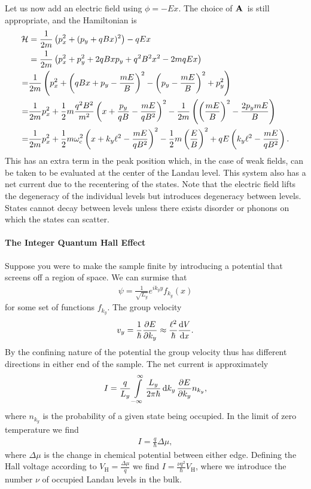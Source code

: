 Let us now add an electric field using $\phi = -Ex$. The choice of $\vb{A}$ is still appropriate, and the Hamiltonian is
\begin{align*}
	\mathcal{H} &= \frac{1}{2m}\left(p_{x}^{2} + (p_{y} + qBx)^{2}\right) - qEx \\
	     &= \frac{1}{2m}\left(p_{x}^{2} + p_{y}^{2} + 2qBxp_{y} + q^{2}B^{2}x^{2} - 2mqEx\right) \\
	     =& \frac{1}{2m}\left(p_{x}^{2} + \left(qBx + p_{y} - \frac{mE}{B}\right)^{2} - \left(p_{y} - \frac{mE}{B}\right)^{2} + p_{y}^{2}\right) \\
	     =& \frac{1}{2m}p_{x}^{2} + \frac{1}{2}m\frac{q^{2}B^{2}}{m^{2}}\left(x + \frac{p_{y}}{qB} - \frac{mE}{qB^{2}}\right)^{2} - \frac{1}{2m}\left(\left(\frac{mE}{B}\right)^{2} - \frac{2p_{y}mE}{B}\right) \\
	     =& \frac{1}{2m}p_{x}^{2} + \frac{1}{2}m\omega_{\text{c}}^{2}\left(x + k_{y}\ell^{2} - \frac{mE}{qB^{2}}\right)^{2} - \frac{1}{2}m\left(\frac{E}{B}\right)^{2} +  qE\left(k_{y}\ell^{2} - \frac{mE}{qB^{2}}\right).
\end{align*}
This has an extra term in the peak position which, in the case of weak fields, can be taken to be evaluated at the center of the Landau level. This system also has a net current due to the recentering of the states. Note that the electric field lifts the degeneracy of the individual levels but introduces degeneracy between levels. States cannot decay between levels unless there exists disorder or phonons on which the states can scatter.

\paragraph{The Integer Quantum Hall Effect}
Suppose you were to make the sample finite by introducing a potential that screens off a region of space. We can surmise that
\begin{align*}
	\psi = \frac{1}{\sqrt{L_{y}}}e^{ik_{y}y}f_{k_{y}}(x)
\end{align*}
for some set of functions $f_{k_{y}}$. The group velocity
\begin{align*}
	v_{y} = \frac{1}{\hbar}\pdv{E}{k_{y}} \approx \frac{\ell^{2}}{\hbar}\dv{V}{x}.
\end{align*}
By the confining nature of the potential the group velocity thus has different directions in either end of the sample. The net current is approximately
\begin{align*}
	I = \frac{q}{L_{y}}\int\limits_{-\infty}^{\infty}\frac{L_{y}}{2\pi\hbar}\dd{k_{y}}\pdv{E}{k_{y}}n_{k_{y}},
\end{align*}
where $n_{k_{y}}$ is the probability of a given state being occupied. In the limit of zero temperature we find
\begin{align*}
	I = \frac{q}{\hbar}\Delta\mu,
\end{align*}
where $\Delta\mu$ is the change in chemical potential between either edge. Defining the Hall voltage according to $V_{\text{H}} = \frac{\Delta\mu}{q}$ we find $I = \frac{\nu q^{2}}{\hbar}V_{\text{H}}$, where we introduce the number $\nu$ of occupied Landau levels in the bulk.

